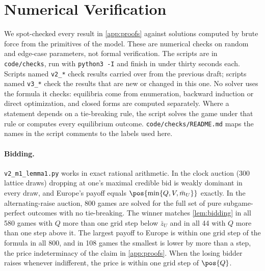 \section{Numerical Verification}\label{app:numerics}

We spot-checked every result in \cref{app:proofs} against solutions computed by brute force from the primitives of the model. These are numerical checks on random and edge-case parameters, not formal verification. The scripts are in \texttt{code/checks}, run with \texttt{python3 -I} and finish in under thirty seconds each. Scripts named \texttt{v2\_*} check results carried over from the previous draft; scripts named \texttt{v3\_*} check the results that are new or changed in this one. No solver uses the formula it checks: equilibria come from enumeration, backward induction or direct optimization, and closed forms are computed separately. Where a statement depends on a tie-breaking rule, the script solves the game under that rule or computes every equilibrium outcome. \texttt{code/checks/README.md} maps the names in the script comments to the labels used here.

\paragraph{Bidding.} \texttt{v2\_m1\_lemma1.py} works in exact rational arithmetic. In the clock auction (300 lattice draws) dropping at one's maximal credible bid is weakly dominant in every draw, and Europe's payoff equals $\pos{\min\{Q,V,\bar m_U\}}$ exactly. In the alternating-raise auction, 800 games are solved for the full set of pure subgame-perfect outcomes with no tie-breaking. The winner matches \cref{lem:bidding} in all 580 games with $Q$ more than one grid step below $\bar z_U$ and in all 44 with $Q$ more than one step above it. The largest payoff to Europe is within one grid step of the formula in all 800, and in 108 games the smallest is lower by more than a step, the price indeterminacy of the claim in \cref{app:proofs}. When the losing bidder raises whenever indifferent, the price is within one grid step of $\pos{Q}$.

